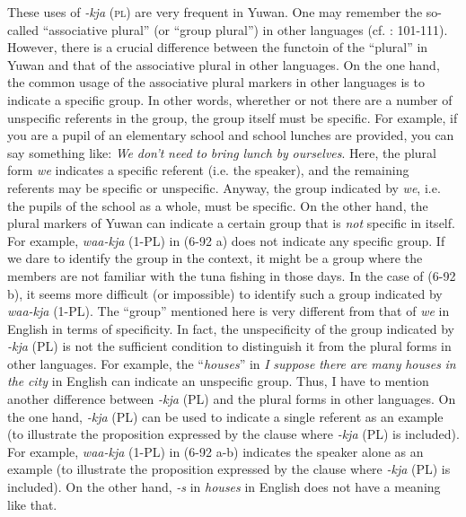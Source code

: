   These uses of \textit{{}-kja} (\textsc{pl}) are very frequent in Yuwan. One may remember the so-called “associative plural” (or “group plural”) in other languages (cf. \citealt{Corbett2000}: 101-111). However, there is a crucial difference between the functoin of the “plural” in Yuwan and that of the associative plural in other languages. On the one hand, the common usage of the associative plural markers in other languages is to indicate a specific group. In other words, wherether or not there are a number of unspecific referents in the group, the group itself must be specific. For example, if you are a pupil of an elementary school and school lunches are provided, you can say something like: \textit{We} \textit{don’t} \textit{need} \textit{to} \textit{bring} \textit{lunch} \textit{by} \textit{ourselves}. Here, the plural form \textit{we} indicates a specific referent (i.e. the speaker), and the remaining referents may be specific or unspecific. Anyway, the group indicated by \textit{we}, i.e. the pupils of the school as a whole, must be specific. On the other hand, the plural markers of Yuwan can indicate a certain group that is \textit{not} specific in itself. For example, \textit{waa-kja} (1-PL) in (6-92 a) does not indicate any specific group. If we dare to identify the group in the context, it might be a group where the members are not familiar with the tuna fishing in those days. In the case of (6-92 b), it seems more difficult (or impossible) to identify such a group indicated by \textit{waa-kja} (1-PL). The “group” mentioned here is very different from that of \textit{we} in English in terms of specificity. In fact, the unspecificity of the group indicated by \textit{{}-kja} (PL) is not the sufficient condition to distinguish it from the plural forms in other languages. For example, the “\textit{houses}” in \textit{I} \textit{suppose} \textit{there} \textit{are} \textit{many} \textit{houses} \textit{in} \textit{the} \textit{city} in English can indicate an unspecific group. Thus, I have to mention another difference between \textit{{}-kja} (PL) and the plural forms in other languages. On the one hand, \textit{{}-kja} (PL) can be used to indicate a single referent as an example (to illustrate the proposition expressed by the clause where \textit{{}-kja} (PL) is included). For example, \textit{waa-kja} (1-PL) in (6-92 a-b) indicates the speaker alone as an example (to illustrate the proposition expressed by the clause where \textit{{}-kja} (PL) is included). On the other hand, \textit{{}-s} in \textit{houses} in English does not have a meaning like that.

